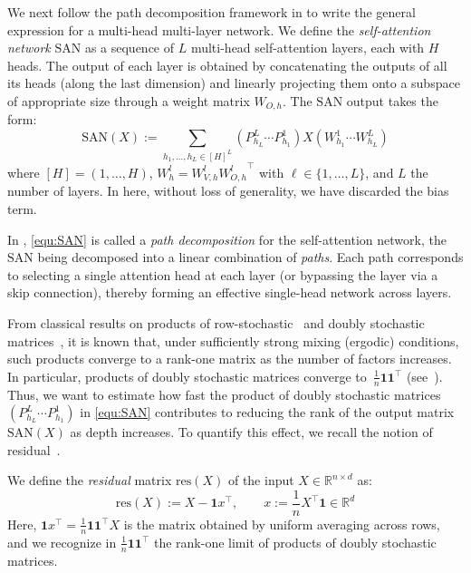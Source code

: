 \documentclass{article}
\newcommand{\R}{\mathbb{R}}
\theoremstyle{definition}
\theoremstyle{plain}
\begin{document}
{{We next follow the path decomposition framework in \cite{dong2021attention} to write the general expression for a multi-head multi-layer network.}
We define the \textit{self-attention network} $\mathrm{SAN}$ as a sequence of $L$ multi-head self-attention layers{, each with $H$ heads.} The output of each layer is obtained by concatenating the outputs of all its heads (along the last dimension) and linearly projecting them onto a subspace of appropriate size through a weight matrix $W_{O,h}$. {The $\mathrm{SAN}$ output takes the form:}
\begin{equation}\label{equ:SAN}
\mathrm{SAN}(X):=\sum_{h_1,\ldots,h_L \in [H]^L}\left(P^{L}_{h_L} \cdots P^{1}_{h_1}\right)X\left(W^{1}_{h_1} \cdots W^{L}_{h_L}\right)
\end{equation}
where $[H] = (1, \ldots, H)$, {$W^{l}_h = W^{l}_{V,h} {W_{O,h}^{l}}^\top$ with $\ell \in \{1,\dots,L\}$}, and  $L$ the number of layers. {In here, without loss of generality, we have discarded the bias term.}

In \cite{dong2021attention}, \ref{equ:SAN} is called a \textit{path decomposition} for the self-attention network, the $\mathrm{SAN}$ being decomposed into a linear combination of \textit{paths}. Each path corresponds to selecting a single attention head at each layer (or bypassing the layer via a skip connection), thereby forming an effective single-head network across layers.

From classical results on products of row-stochastic~\cite{wolfowitz,Anthonisse1977ExponentialCO} and doubly stochastic matrices~\cite{Schwarz1980}, it is known that, under sufficiently strong mixing (ergodic) conditions, such products converge to a rank-one matrix as the number of factors increases. {In particular, products of {doubly} stochastic matrices converge to~$\frac{1}{n}\mathbf{1}\mathbf{1}^\top$ (see~\cite{Schwarz1980}).} Thus, we want to estimate how fast the product of doubly stochastic matrices $(P^{L}_{h_L} \cdots P^{1}_{h_1})$ in \ref{equ:SAN} contributes to reducing the rank of the output matrix $\mathrm{SAN}(X)$ {as depth increases}. To quantify this effect, we recall the notion of residual~\cite{dong2021attention}.

We define the \textit{residual} matrix $\mathrm{res}(X)$ of the input $X \in \R^{n \times d}$ as:
\begin{equation}\label{equ:residual}
\mathrm{res}(X) := X - \mathbf{1} x^\top,
\qquad
x := \frac{1}{n} X^\top \mathbf{1} \in \mathbb{R}^d
\end{equation}
Here, $\mathbf{1}x^\top = \frac{1}{n}\mathbf{1}\mathbf{1}^\top X$ is the matrix obtained by uniform averaging across rows, and we recognize in $\frac{1}{n}\mathbf{1}\mathbf{1}^\top$ the rank-one limit of products of doubly stochastic matrices.

}
\end{document}
